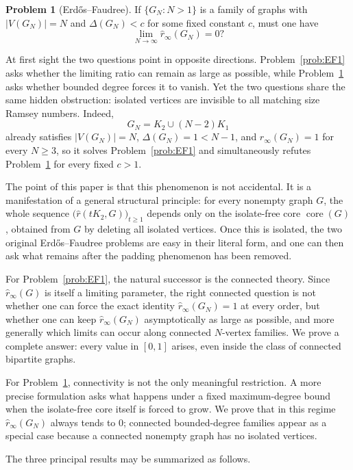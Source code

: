 \documentclass[11pt]{article}
\newcommand{\sr}{\hat r}
\newcommand{\sri}{\hat r_{\infty}}
\newcommand{\core}{\operatorname{core}}
\theoremstyle{definition}
\newtheorem{problem}[theorem]{Problem}
\theoremstyle{remark}
\newcounter{case}
\begin{document}
\begin{problem}[Erd\H{o}s--Faudree]\label{prob:EF2}
If $\{G_N:N>1\}$ is a family of graphs with $|V(G_N)|=N$ and
$\Delta(G_N)<c$
for some fixed constant $c$, must one have
\[
\lim_{N\to\infty}\sri(G_N)=0?
\]
\end{problem}



At first sight the two questions point in opposite directions. Problem~\ref{prob:EF1}
asks whether the limiting ratio can remain as large as possible, while
Problem~\ref{prob:EF2} asks whether bounded degree forces it to vanish. Yet the two
questions share the same hidden obstruction: isolated vertices are invisible to all matching
size Ramsey numbers. Indeed,
\[
G_N=K_2\cup (N-2)K_1
\]
already satisfies $|V(G_N)|=N$, $\Delta(G_N)=1<N-1$, and $\sri(G_N)=1$ for every
$N\ge 3$, so it solves Problem~\ref{prob:EF1} and simultaneously refutes
Problem~\ref{prob:EF2} for every fixed $c>1$.

The point of this paper is that this phenomenon is not accidental. It is a manifestation of a
general structural principle: for every nonempty graph $G$, the whole sequence
$\bigl(\sr(tK_2,G)\bigr)_{t\ge 1}$ depends only on the isolate-free core $\core(G)$,
obtained from $G$ by deleting all isolated vertices.
Once this is isolated, the two original Erd\H{o}s--Faudree problems are easy in their literal
form, and one can then ask what remains after the padding phenomenon has been removed.

For Problem~\ref{prob:EF1}, the natural successor is the connected theory. Since
$\sri(G)$ is itself a limiting parameter, the right connected question is not whether one can
force the exact identity $\sri(G_N)=1$ at every order, but whether one can keep
$\sri(G_N)$ asymptotically as large as possible, and more generally which limits can occur
along connected $N$-vertex families. We prove a complete answer: every value in $[0,1]$
arises, even inside the class of connected bipartite graphs.

For Problem~\ref{prob:EF2}, connectivity is not the only meaningful restriction. A more
precise formulation asks what happens under a fixed maximum-degree bound when the
isolate-free core itself is forced to grow. We prove that in this regime $\sri(G_N)$ always
tends to $0$; connected bounded-degree families appear as a special case because a
connected nonempty graph has no isolated vertices.

The three principal results may be summarized as follows.
\end{document}
